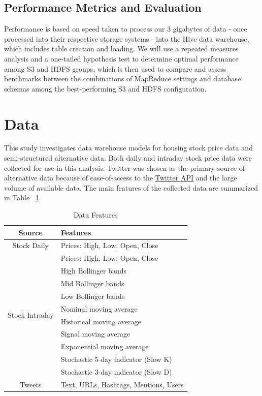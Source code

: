 \documentclass[journal]{IEEEtran}
\begin{document}
	
	\subsection{Performance Metrics and Evaluation}
	
	Performance is based on speed taken to process our 3 gigabytes of data 
	- once processed into their respective storage systems - 
	into the Hive data warehouse, which includes table creation and loading. 
	We will use a repeated measures analysis and a one-tailed hypothesis 
	test to determine optimal performance among S3 and HDFS groups, 
	which is then used to compare and assess benchmarks between the 
	combinations of MapReduce settings and database schemas among the
	best-performing S3 and HDFS configuration.
	
	
	
	
	\section{Data}
	
	This study investigates data warehouse models for housing stock
	price data and semi-structured alternative data. 
	Both daily and intraday stock price data were collected
	for use in this analysis. 
	Twitter was chosen as the primary source of alternative data because of
	ease-of-access to the \href{https://developer.twitter.com/en/docs}{Twitter API} 
	and the large volume of available data.
	The main features of the collected data are summarized in Table ~\ref{DataFeatures}.
	
	\begin{table}
		\renewcommand{\arraystretch}{1.3}
		\caption{Data Features}
		\label{DataFeatures}
		\centering
		\begin{tabular}{c|l}
			\hline
			Source       & Features\\
			\hline
			\hline
			Stock Daily  & Prices: High, Low, Open, Close\\
			\hline
			\multirow{10}{*}{Stock Intraday} &  Prices: High, Low, Open, Close \\
			&  High Bollinger bands\\
			&  Mid Bollinger bands\\
			&  Low Bollinger bands\\ 
			&  Nominal moving average\\
			&  Historical moving average\\
			&  Signal moving average\\ 
			&  Exponential moving average\\
			&  Stochastic 5-day indicator (Slow K)\\
			&  Stochastic 3-day indicator (Slow D)\\
			\hline
			Tweets       & Text, URLs, Hashtags, Mentions, Users\\
			\hline
		\end{tabular}
	\end{table}
	
\end{document}
